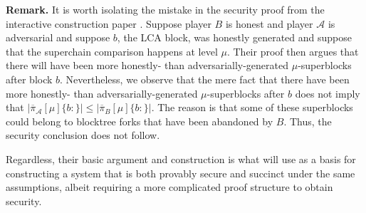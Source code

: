 \textbf{Remark.} It is worth isolating the mistake in the security proof from
the interactive construction paper \cite{KLS}. Suppose player $B$ is honest and
player $\mathcal{A}$ is adversarial and suppose $b$, the LCA block, was honestly
generated and suppose that the superchain comparison happens at level $\mu$.
Their proof then argues that there will have been more honestly- than
adversarially-generated $\mu$-superblocks after block $b$. Nevertheless, we
observe that the mere fact that there have been more honestly- than
adversarially-generated $\mu$-superblocks after $b$ does not imply that
$|\overline\pi_\mathcal{A}[\mu]\{b:\}| \leq |\overline\pi_B[\mu]\{b:\}|$. The
reason is that some of these superblocks could belong to blocktree forks that
have been abandoned by $B$. Thus, the security conclusion does not follow.

Regardless, their basic argument and construction is what will use as a basis
for constructing a system that is both provably secure and succinct under the
same assumptions, albeit requiring a more complicated proof structure to obtain
security.
